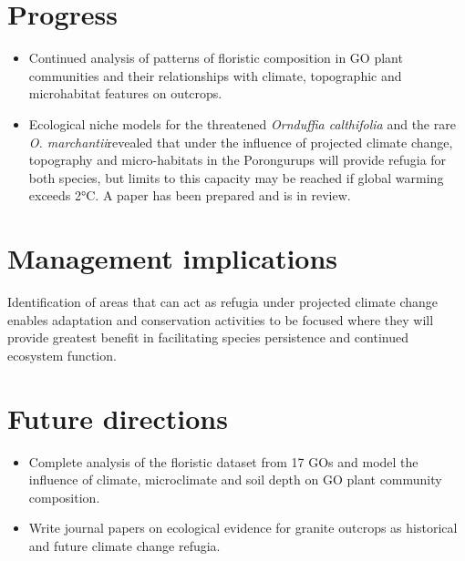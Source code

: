 \documentclass[version=last,
    paper=a4, %
    10pt, %
    usenames,
    dvipsnames,
    oneside, %
    headings=openany, %
    DIV=15 %
]{scrbook}
\begin{document}
\section*{Progress}
\begin{itemize}
\itemsep1pt\parskip0pt
\item
  Continued analysis of patterns of floristic composition in GO plant
  communities and their relationships with climate, topographic and
  microhabitat features on outcrops.
\item
  Ecological niche models for the threatened \emph{Ornduffia
  calthifolia} and the rare \emph{O. marchantii}revealed that under the
  influence of projected climate change, topography and micro-habitats
  in the Porongurups will provide refugia for both species, but limits
  to this capacity may be reached if global warming exceeds 2°C. A paper
  has been prepared and is in review.
\end{itemize}



\section*{Management implications}
Identification of areas that can act as refugia under projected climate
change enables adaptation and conservation activities to be focused
where they will provide greatest benefit in facilitating species
persistence and continued ecosystem function.



\section*{Future directions}
\begin{itemize}
\itemsep1pt\parskip0pt
\item
  Complete analysis of the floristic dataset from 17 GOs and model the
  influence of climate, microclimate and soil depth on GO plant
  community composition.
\item
  Write journal papers on ecological evidence for granite outcrops as
  historical and future climate change refugia.
\end{itemize}



\end{document}
